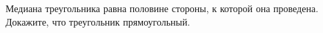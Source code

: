 \begin{ex}
	\begin{condition}
		Медиана треугольника равна половине стороны, к которой она проведена. Докажите, что треугольник прямоугольный.
	\end{condition}
\end{ex}